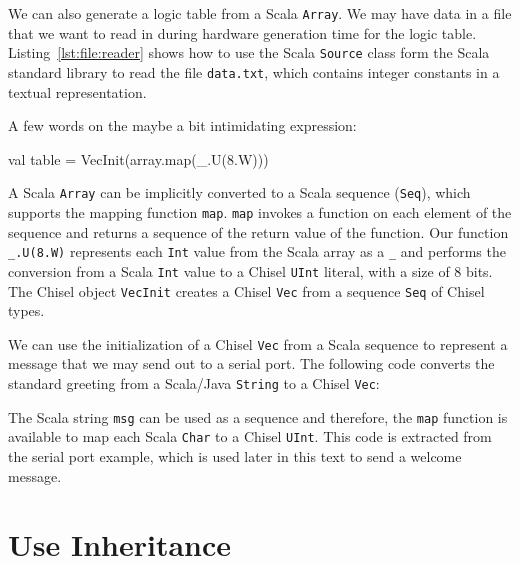 \documentclass[%
    10pt,
    headinclude, footexclude,
    openright, %
    notitlepage,
    cleardoubleempty,
    headsepline,
    pointlessnumbers,
    bibtotoc, idxtotoc,
    ]{scrbook}
\newcommand{\code}[1]{{\small{\texttt{#1}}}}
\begin{document}


We can also generate a logic table from a Scala \code{Array}.
We may have data in a file that we want to read in during hardware generation
time for the logic table.
Listing~\ref{lst:file:reader} shows how to use the Scala \code{Source}
class form the Scala standard library to read the file \code{data.txt}, which
contains integer constants in a textual representation.


A few words on the maybe a bit intimidating expression:
\begin{chisel}
  val table = VecInit(array.map(_.U(8.W)))
\end{chisel}


\noindent A Scala \code{Array} can be implicitly converted to a Scala sequence (\code{Seq}),
which supports the mapping function \code{map}.
\code{map} invokes a function on each element of the sequence and returns
a sequence of the return value of the function. Our function \code{\_.U(8.W)} represents
each \code{Int} value from the Scala array as a \code{\_} and performs the conversion
from a Scala \code{Int} value to a Chisel \code{UInt} literal, with a size of 8 bits.
The Chisel object \code{VecInit} creates a Chisel \code{Vec} from a sequence \code{Seq}
of Chisel types.

We can use the initialization of a Chisel \code{Vec} from a Scala sequence to represent
a message that we may send out to a serial port. The following code converts the standard greeting
from a Scala/Java \code{String} to a Chisel \code{Vec}:


\noindent The Scala string \code{msg} can be used as a sequence and therefore, the \code{map}
function is available to map each Scala \code{Char} to a Chisel \code{UInt}.
This code is extracted from the serial port example, which is used later in this text to send a welcome message.



\section{Use Inheritance}
\label{sec:inheritance}

\end{document}
